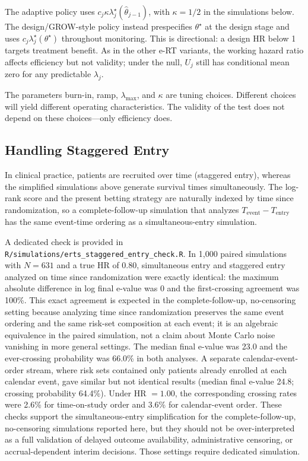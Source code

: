 \documentclass[10pt]{article}
\begin{document}
The adaptive policy uses $c_j \kappa \lambda_j^\star(\hat{\theta}_{j-1})$, with $\kappa=1/2$ in the simulations below. The design/GROW-style policy instead prespecifies $\theta^\star$ at the design stage and uses $c_j\lambda_j^\star(\theta^\star)$ throughout monitoring. This is directional: a design HR below 1 targets treatment benefit. As in the other e-RT variants, the working hazard ratio affects efficiency but not validity; under the null, $U_j$ still has conditional mean zero for any predictable $\lambda_j$.

The parameters burn-in, ramp, $\lambda_{\max}$, and $\kappa$ are tuning choices. Different choices will yield different operating characteristics. The validity of the test does not depend on these choices---only efficiency does.

\subsection{Handling Staggered Entry}

In clinical practice, patients are recruited over time (staggered entry), whereas the simplified simulations above generate survival times simultaneously. The log-rank score and the present betting strategy are naturally indexed by time since randomization, so a complete-follow-up simulation that analyzes $T_{\text{event}} - T_{\text{entry}}$ has the same event-time ordering as a simultaneous-entry simulation.

A dedicated check is provided in \texttt{R/simulations/erts\_staggered\_entry\_check.R}. In 1{,}000 paired simulations with $N=631$ and a true HR of 0.80, simultaneous entry and staggered entry analyzed on time since randomization were exactly identical: the maximum absolute difference in log final e-value was 0 and the first-crossing agreement was 100\%. This exact agreement is expected in the complete-follow-up, no-censoring setting because analyzing time since randomization preserves the same event ordering and the same risk-set composition at each event; it is an algebraic equivalence in the paired simulation, not a claim about Monte Carlo noise vanishing in more general settings. The median final e-value was 23.0 and the ever-crossing probability was 66.0\% in both analyses. A separate calendar-event-order stream, where risk sets contained only patients already enrolled at each calendar event, gave similar but not identical results (median final e-value 24.8; crossing probability 64.4\%). Under HR $=1.00$, the corresponding crossing rates were 2.6\% for time-on-study order and 3.6\% for calendar-event order. These checks support the simultaneous-entry simplification for the complete-follow-up, no-censoring simulations reported here, but they should not be over-interpreted as a full validation of delayed outcome availability, administrative censoring, or accrual-dependent interim decisions. Those settings require dedicated simulation.
\end{document}
